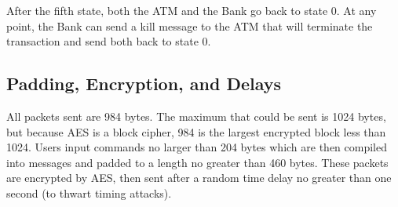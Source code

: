 \documentclass[10pt,a4paper]{article}
\begin{document}
After the fifth state, both the ATM and the Bank go back to state 0. At any point, the Bank can send a kill message to the ATM that will terminate the transaction and send both back to state 0.

\subsection{Padding, Encryption, and Delays}

All packets sent are 984 bytes. The maximum that could be sent is 1024 bytes, but because AES is a block cipher, 984 is the largest encrypted block less than 1024. Users input commands no larger than 204 bytes which are then compiled into messages and padded to a length no greater than 460 bytes. These packets are encrypted by AES, then sent after a random time delay no greater than one second (to thwart timing attacks).
\end{document}
